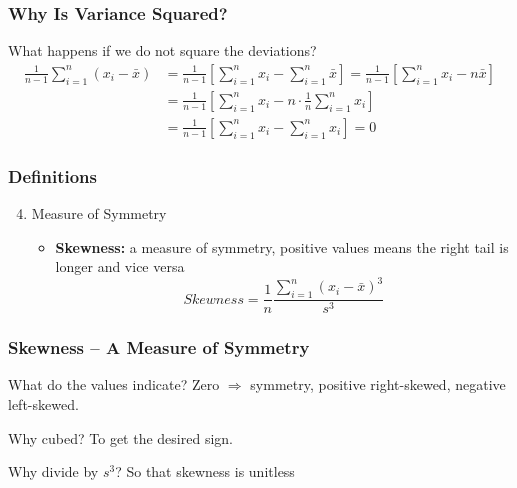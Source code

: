 \documentclass{beamer}
\begin{document}
 \begin{frame}
 \frametitle{Why Is Variance Squared?}
	What happens if we do not square the deviations?
	\onslide<2-> \begin{align*}
	 		\frac{1}{n - 1} \sum_{i = 1}^n (x_i - \bar{x}) &= \frac{1}{n - 1} \left[\sum_{i = 1}^n x_i - 					\sum_{i = 1}^n \bar{x} \right] = \frac{1}{n - 1} \left[ \sum_{i = 1}^n x_i  - n\bar{x} \right]
	 		\\
	 		&= \frac{1}{n - 1} \left[ \sum_{i = 1}^n x_i  - n \cdot \frac{1}{n} \sum_{i = 1}^n x_i \right]
	 		\\ 
	 		&= \frac{1}{n - 1} \left[ \sum_{i = 1}^n x_i  -  \sum_{i = 1}^n x_i \right] = 0
	 	\end{align*}
\end{frame}

\begin{frame}
\frametitle{Definitions}
	\begin{enumerate}
	\setcounter{enumi}{3}
		\item Measure of Symmetry
		\begin{itemize}
			\item \textbf{Skewness:} a measure of symmetry, positive values means the right tail is 				longer and vice versa
			$$
			Skewness = \frac{1}{n}\frac{\sum_{i = 1}^n (x_i - \bar{x})^3}{s^3}
			$$
		\end{itemize}
	\end{enumerate}
\end{frame}

 \begin{frame}
 \frametitle{Skewness -- A Measure of Symmetry}
	 \begin{center}
	 \end{center}
	 \begin{block}{What do the values indicate?}
	 	Zero $\Rightarrow$ symmetry, positive right-skewed, negative left-skewed.
	 \end{block}
	 \begin{block}{Why cubed?}
	 	To get the desired sign.
	 \end{block}
	 \begin{block}{Why divide by $s^3$?}
	 	So that skewness is unitless
	 \end{block}
 \end{frame}
 
\end{document}
